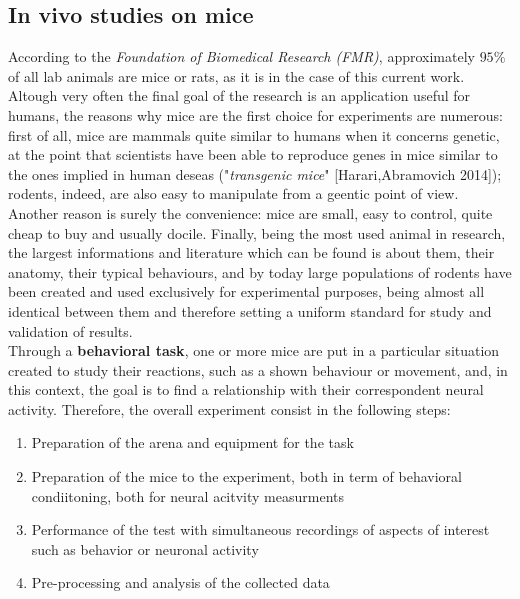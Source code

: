 \documentclass[a4paper]{article}
\begin{document}
\newpage

\subsection{In vivo studies on mice}

According to the \textit{Foundation of Biomedical Research (FMR)}, approximately $95\% $ of all lab animals are mice or rats, as it is in the case of this current work. Altough very often the final goal of the research is an application useful for humans, the reasons why mice are the first choice for experiments are numerous: first of all, mice are mammals quite similar to humans when it concerns genetic, at the point that scientists have been able to reproduce genes in mice similar to the ones implied in human deseas ("\textit{transgenic mice}" [Harari,Abramovich 2014]); rodents, indeed, are also easy to manipulate from a geentic point of view. Another reason is surely the convenience: mice are small, easy to control, quite cheap to buy and usually docile. Finally, being the most used animal in research, the largest informations and literature which can be found is about them, their anatomy, their typical behaviours, and by today large populations of rodents have been created and used exclusively for experimental purposes, being almost all identical between them and therefore setting a uniform standard for study and validation of results. \\
Through a  \textbf{behavioral task}, one or more mice are put in a particular situation created to study their reactions, such as a shown behaviour or movement, and, in this context, the goal is to find a relationship with their correspondent neural activity. Therefore, the overall experiment consist in the following steps:
\begin{enumerate}
	\item Preparation of the arena and equipment for the task 
	\item Preparation of the mice to the experiment, both in term of behavioral condiitoning, both for neural acitvity measurments
	\item Performance of the test with simultaneous recordings of  aspects of interest such as behavior or neuronal activity
	\item Pre-processing and analysis of the collected data
\end{enumerate}
\end{document}
